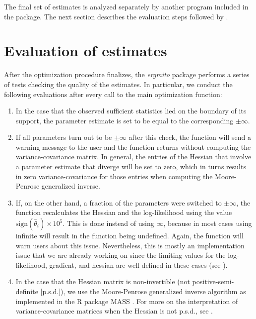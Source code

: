 \documentclass[review, nonatbib,doubleblind]{elsarticle/elsarticle}
\begin{document}
The final set of estimates is analyzed separately by another program included in the package. The next section describes the evaluation steps followed by \ergmito{}.

\section{\label{sec:evaluation-of-estimates}Evaluation of estimates}

After the optimization procedure finalizes, the \textit{ergmito} package performs a series of tests checking the quality of the estimates. In particular, we conduct the following evaluations after every call to the main optimization function:

\begin{enumerate}
	\item In the case that the observed sufficient statistics lied on the boundary of its support, the parameter estimate is set to be equal to the corresponding $\pm\infty$.
	
	\item If all parameters turn out to be $\pm\infty$ after this check, the function will send a warning message to the user and the function returns without computing the variance-covariance matrix. In general, the entries of the Hessian that involve a parameter estimate that diverge will be set to zero, which in turns results in zero variance-covariance for those entries when computing the Moore-Penrose generalized inverse. 
	
	\item If, on the other hand, a fraction of the parameters were switched to $\pm\infty$, the function recalculates the Hessian and the log-likelihood using the value $\mbox{sign}(\hat \theta_i)\times 10^{5}$. This is done instead of using $\infty$, because in most cases using infinite will result in the function being undefined. Again, the function will warn users about this issue. Nevertheless, this is mostly an implementation issue that we are already working on since the limiting values for the log-likelihood, gradient, and hessian are well defined in these cases (see \cite{Handcock2003}).
	
	\item In the case that the Hessian matrix is non-invertible (not positive-semi-definite [p.s.d.]), we use the Moore-Penrose generalized inverse algorithm as implemented in the R package MASS \cite{Venables2002}. For more on the interpretation of variance-covariance matrices when the Hessian is not p.s.d., see \cite{Gill2004}.
\end{enumerate}
\end{document}

